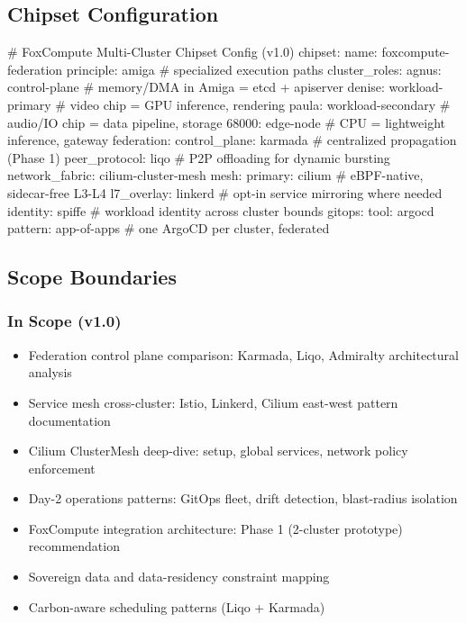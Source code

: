 \documentclass[11pt,letterpaper]{article}
\begin{document}
\subsection{Chipset Configuration}

\begin{asciibox}
# FoxCompute Multi-Cluster Chipset Config (v1.0)
chipset:
  name: foxcompute-federation
  principle: amiga                    # specialized execution paths
  cluster_roles:
    agnus:   control-plane            # memory/DMA in Amiga = etcd + apiserver
    denise:  workload-primary         # video chip = GPU inference, rendering
    paula:   workload-secondary       # audio/IO chip = data pipeline, storage
    68000:   edge-node                # CPU = lightweight inference, gateway
  federation:
    control_plane: karmada            # centralized propagation (Phase 1)
    peer_protocol: liqo               # P2P offloading for dynamic bursting
    network_fabric: cilium-cluster-mesh
  mesh:
    primary: cilium                   # eBPF-native, sidecar-free L3-L4
    l7_overlay: linkerd               # opt-in service mirroring where needed
    identity: spiffe                  # workload identity across cluster bounds
  gitops:
    tool: argocd
    pattern: app-of-apps              # one ArgoCD per cluster, federated
\end{asciibox}

\subsection{Scope Boundaries}

\subsubsection{In Scope (v1.0)}
\begin{itemize}[leftmargin=1.5em]
  \item Federation control plane comparison: Karmada, Liqo, Admiralty architectural analysis
  \item Service mesh cross-cluster: Istio, Linkerd, Cilium east-west pattern documentation
  \item Cilium ClusterMesh deep-dive: setup, global services, network policy enforcement
  \item Day-2 operations patterns: GitOps fleet, drift detection, blast-radius isolation
  \item FoxCompute integration architecture: Phase 1 (2-cluster prototype) recommendation
  \item Sovereign data and data-residency constraint mapping
  \item Carbon-aware scheduling patterns (Liqo + Karmada)
\end{itemize}
\end{document}
